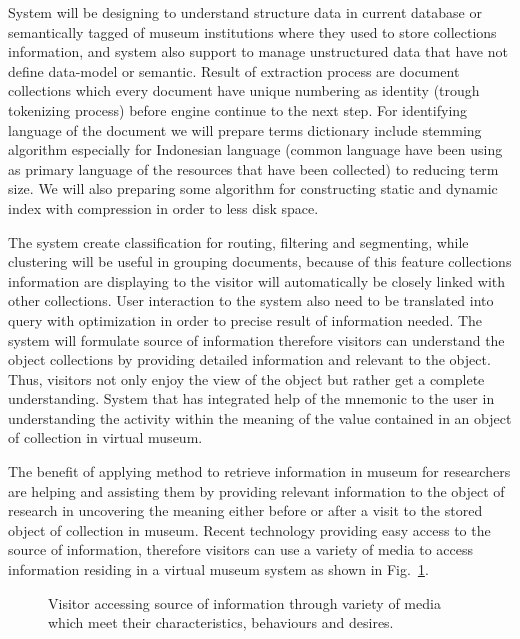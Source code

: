 System will be designing to understand structure data in current database or semantically tagged of museum institutions where they used to store collections information, and system also support to manage unstructured data that have not define data-model or semantic. Result of extraction process are document collections which every document have unique numbering as identity (trough tokenizing process) before engine continue to the next step. For identifying language of the document we will prepare terms dictionary include stemming algorithm especially for Indonesian language (common language have been using as primary language of the resources that have been collected) to reducing term size. We will also preparing some algorithm for constructing static and dynamic index with compression in order to less disk space.

The system create classification for routing, filtering and segmenting, while clustering will be useful in grouping documents, because of this feature collections information are displaying to the visitor will automatically be closely linked with other collections. User interaction to the system also need to be translated into query with optimization in order to precise result of information needed. The system will formulate source of information therefore visitors can understand the object collections by providing detailed information and relevant to the object. Thus, visitors not only enjoy the view of the object but rather get a complete understanding. System that has integrated help of the mnemonic to the user in understanding the activity within the meaning of the value contained in an object of collection in virtual museum.

The benefit of applying method to retrieve information in museum for researchers are helping and assisting them by providing relevant information to the object of research in uncovering the meaning either before or after a visit to the stored object of collection in museum. Recent technology providing easy access to the source of information, therefore visitors can use a variety of media to access information residing in a virtual museum system as shown in Fig.~\cref{fig:visitorsAccess}.

\begin{figure}[ht]
	\caption{Visitor accessing source of information through variety of media which meet their characteristics, behaviours and desires.}\label{fig:visitorsAccess}
\end{figure}

